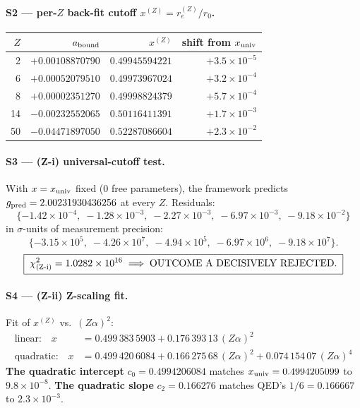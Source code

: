 \paragraph{S2 --- per-$Z$ back-fit cutoff $x^{(Z)} = r_e^{(Z)}/r_0$.}
\begin{center}
\begin{tabular}{rrrr}
\toprule
$Z$ & $a_{\rm bound}$       & $x^{(Z)}$           & shift from $x_{\rm univ}$ \\
\midrule
2  & $+0.00108870790$      & $0.49945594221$     & $+3.5\times 10^{-5}$ \\
6  & $+0.00052079510$      & $0.49973967024$     & $+3.2\times 10^{-4}$ \\
8  & $+0.00002351270$      & $0.49998824379$     & $+5.7\times 10^{-4}$ \\
14 & $-0.00232552065$      & $0.50116411391$     & $+1.7\times 10^{-3}$ \\
50 & $-0.04471897050$      & $0.52287086604$     & $+2.3\times 10^{-2}$ \\
\bottomrule
\end{tabular}
\end{center}

\paragraph{S3 --- (Z-i) universal-cutoff test.}
With $x = x_{\rm univ}$ fixed (0 free parameters), the framework predicts
$g_{\rm pred} = 2.00231930436256$ at every $Z$. Residuals:
\[
\{-1.42\times 10^{-4},\; -1.28\times 10^{-3},\; -2.27\times 10^{-3},\;
  -6.97\times 10^{-3},\; -9.18\times 10^{-2}\}
\]
in $\sigma$-units of measurement precision:
\[
\{-3.15\times 10^{5},\; -4.26\times 10^{7},\; -4.94\times 10^{5},\;
  -6.97\times 10^{6},\; -9.18\times 10^{7}\}.
\]
\[
\boxed{\;
  \chi^2_{\rm (Z\text{-}i)} = 1.0282\times 10^{16}
  \;\Longrightarrow\; \text{OUTCOME A DECISIVELY REJECTED.}
\;}
\]

\paragraph{S4 --- (Z-ii) Z-scaling fit.}
Fit of $x^{(Z)}$ vs.~$(Z\alpha)^2$:
\begin{align*}
\text{linear:}\quad x &= 0.499\,383\,5903 + 0.176\,393\,13\,(Z\alpha)^2 \\
\text{quadratic:}\quad x &= 0.499\,420\,6084 + 0.166\,275\,68\,(Z\alpha)^2
                          + 0.074\,154\,07\,(Z\alpha)^4
\end{align*}
\textbf{The quadratic intercept} $c_0 = 0.4994206084$ matches
$x_{\rm univ} = 0.4994205099$ to $9.8\times 10^{-8}$.
\textbf{The quadratic slope} $c_2 = 0.166276$ matches QED's
$1/6 = 0.166667$ to $2.3\times 10^{-3}$.

